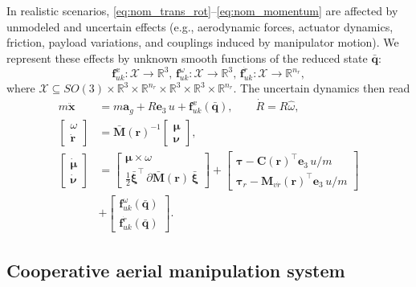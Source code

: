 \documentclass[letterpaper, 10 pt, conference]{ieeeconf}  %
\newcommand{\0}{\matr{0}}
\begin{document}
In realistic scenarios, \eqref{eq:nom_trans_rot}--\eqref{eq:nom_momentum} are affected by unmodeled and uncertain
effects (e.g., aerodynamic forces, actuator dynamics, friction, payload variations, and couplings induced by manipulator motion).
We represent these effects by unknown smooth functions of the reduced state $\bar{\mathbf q}$:
\[
\mathbf f_{uk}^{x}:\mathcal X\to\mathbb R^{3},\,
\mathbf f_{uk}^{\omega}:\mathcal X\to\mathbb R^{3},\,
\mathbf f_{uk}^{\dot r}:\mathcal X\to\mathbb R^{n_r},
\] where $\mathcal X\subseteq SO(3)\times\mathbb R^3\times\mathbb R^{n_r}\times\mathbb R^3\times\mathbb R^3\times\mathbb R^{n_r}$. The uncertain dynamics then read
\begin{align}
m\ddot{\mathbf x} &= m\mathbf a_g + R\mathbf e_3\,u + \mathbf f_{uk}^{x}(\bar{\mathbf q}),
\qquad \dot R = R\hat\omega,
\label{eq:sys_unc_1}\\
\begin{bmatrix}\omega\\ \dot{\mathbf r}\end{bmatrix}
&= \bar{\mathbf M}(\mathbf r)^{-1}\begin{bmatrix}\boldsymbol{\mu}\\ \boldsymbol{\nu}\end{bmatrix},
\label{eq:sys_unc_2}\\
\begin{bmatrix}\dot{\boldsymbol{\mu}}\\ \dot{\boldsymbol{\nu}}\end{bmatrix}
&=
\begin{bmatrix}
\boldsymbol{\mu}\times\omega\\[1mm]
\frac{1}{2}\bar{\boldsymbol{\xi}}^{\!\top}\,\partial \bar{\mathbf M}(\mathbf r)\,\bar{\boldsymbol{\xi}}
\end{bmatrix}
+
\begin{bmatrix}
\boldsymbol{\tau} - \mathbf C(\mathbf r)^{\!\top} \mathbf e_3\,u/m\\[1mm]
\boldsymbol{\tau}_r - \mathbf M_{v\dot r}(\mathbf r)^{\!\top}\mathbf e_3\,u/m
\end{bmatrix}
\\&+
\begin{bmatrix}
\mathbf f_{uk}^{\omega}(\bar{\mathbf q})\\
\mathbf f_{uk}^{\dot r}(\bar{\mathbf q})\nonumber
\end{bmatrix}.
\label{eq:sys_unc_3}
\end{align}

\subsection{Cooperative aerial manipulation system}
\label{subsec:dae_model}
\end{document}
